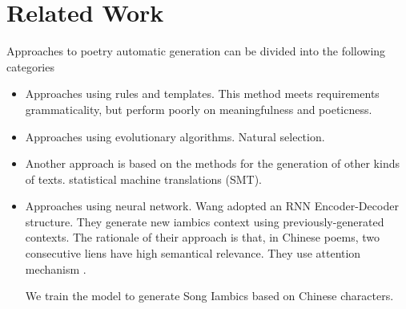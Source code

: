 \section{Related Work}  
Approaches to poetry automatic generation can be divided into the following categories
\begin{itemize}
\item Approaches using rules and templates. This method meets requirements grammaticality, but perform poorly on meaningfulness and poeticness.
\item Approaches using evolutionary algorithms. Natural selection.
\item Another approach is based on the methods for the generation of other kinds of texts.
statistical machine translations (SMT).
\item Approaches using neural network.  Wang \etal adopted an RNN Encoder-Decoder structure\cite{wang2016chinese}. They generate new iambics context using previously-generated contexts. The rationale of their approach is that, in Chinese poems, two consecutive liens have high semantical relevance. They use attention mechanism \cite{bahdanau2014neural}.

We train the model to generate Song Iambics based on Chinese characters.
\end{itemize}
